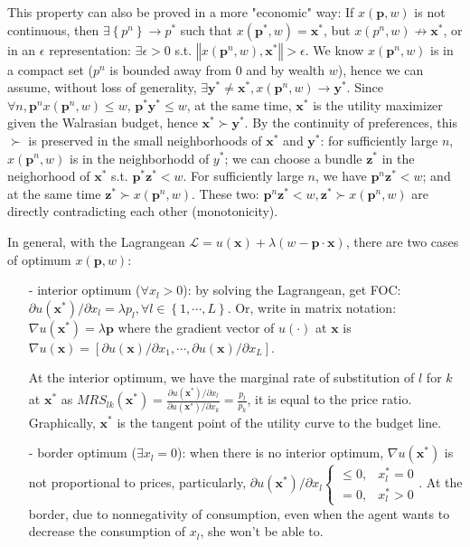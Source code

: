 \begin{enumerate}
    This property can also be proved in a more "economic" way: If $ x(\mathbf{p},w)$ is not continuous, then $\exists\left\{p^n\right\}\rightarrow p^*$ such that $ x(\mathbf{p}^*,w)=\mathbf{x}^*$, but $ x(p^n,w)\not\rightarrow \mathbf{x}^*$, or in an $\epsilon$ representation: $\exists \epsilon>0$ s.t. $\left\Vert  x(\mathbf{p}^n,w),\mathbf{x}^* \right\Vert >\epsilon$. 
    We know $ x(\mathbf{p}^n,w)$ is in a compact set ($p^n$ is bounded away from 0 and by wealth $w$), hence we can assume, without loss of generality, $\exists \mathbf{y}^*\neq \mathbf{x}^*,  x(\mathbf{p}^n,w)\rightarrow \mathbf{y}^*$. Since $\forall n,\mathbf{p}^n x(\mathbf{p}^n,w)\leq w$, $\mathbf{p}^*\mathbf{y}^* \leq w$, at the same time, $\mathbf{x}^*$ is the utility maximizer given the Walrasian budget, hence $\mathbf{x}^*\succ \mathbf{y}^*$.
    By the continuity of preferences, this $\succ$ is preserved in the small neighborhoods of $\mathbf{x}^*$ and $\mathbf{y}^*$: for sufficiently large $n$, $ x(\mathbf{p}^n,w)$ is in the neighborhodd of $y^*$; we can choose a bundle $\mathbf{z}^*$ in the neighorhood of $\mathbf{x}^*$ s.t. $\mathbf{p}^* \mathbf{z}^*<w$. For sufficiently large $n$, we have $\mathbf{p}^n\mathbf{z}^*<w$; and at the same time $\mathbf{z}^*\succ  x(\mathbf{p}^n,w)$. These two: $\mathbf{p}^n\mathbf{z}^*<w,\mathbf{z}^*\succ  x(\mathbf{p}^n,w)$ are directly contradicting each other (monotonicity).
\end{enumerate}

In general, with the Lagrangean $\mathcal{L}=u(\mathbf{x})+\lambda (w-\mathbf{p}\cdot\mathbf{x})$, there are two cases of optimum $ x(\mathbf{p},w)$:
\begin{enumerate}
    \item[-] interior optimum ($\forall x_l>0$): by solving the Lagrangean, get FOC: $\partial u(\mathbf{x}^*)/\partial x_l= \lambda p_l,\forall l\in \left\{1,\cdots,L\right\}$. Or, write in matrix notation: $\nabla u(\mathbf{x}^*)=\lambda \mathbf{p}$ where the gradient vector of $u(\cdot)$ at $\mathbf{x}$ is $\nabla u(\mathbf{x})=\left[\partial u(\mathbf{x})/\partial x_1,\cdots, \partial u(\mathbf{x})/\partial x_L\right]$.
    
    At the interior optimum, we have the marginal rate of substitution of $l$ for $k$ at $\mathbf{x}^*$ as $MRS_{lk}(\mathbf{x}^*)=\frac{\partial u(\mathbf{x}^*)/\partial x_l}{\partial u(\mathbf{x}^*)/\partial x_k}=\frac{p_l}{p_k}$, it is equal to the price ratio. Graphically, $\mathbf{x}^*$ is the tangent point of the utility curve to the budget line.
    \item[-] border optimum ($\exists x_l=0$): when there is no interior optimum, $\nabla u(\mathbf{x}^*)$ is not proportional to prices, particularly, $\partial u(\mathbf{x}^*)/\partial x_l\begin{cases}\leq 0, & x^*_l=0 \\ =0 , & x^*_l>0\end{cases}$. At the border, due to nonnegativity of consumption, even when the agent wants to decrease the consumption of $x_l$, she won't be able to.
\end{enumerate}

